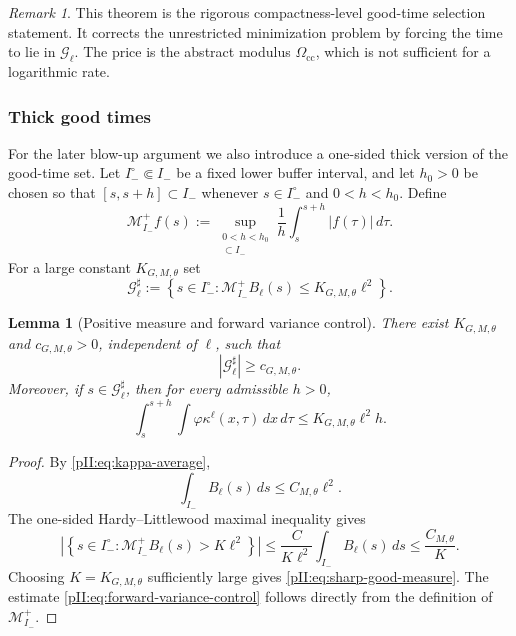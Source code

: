 \documentclass[11pt]{article}
\numberwithin{equation}{section}
\theoremstyle{plain}
\newtheorem{lemma}{Lemma}[section]
\theoremstyle{definition}
\theoremstyle{remark}
\newtheorem{remark}{Remark}[section]
\newcommand{\cc}{\mathrm{cc}}
\newcommand{\dx}{\,dx}
\begin{document}
\begin{remark}\label{pII:rem:abstract-selection-status}
This theorem is the rigorous compactness-level good-time selection statement.  It corrects the unrestricted minimization problem by forcing the time to lie in $\mathcal G_\ell$.  The price is the abstract modulus $\Omega_{\cc}$, which is not sufficient for a logarithmic rate.
\end{remark}

\subsubsection{Thick good times}

For the later blow-up argument we also introduce a one-sided thick version of the good-time set.  Let $I_-^\circ\Subset I_-$ be a fixed lower buffer interval, and let $h_0>0$ be chosen so that $[s,s+h]\subset I_-$ whenever $s\in I_-^\circ$ and $0<h<h_0$.  Define
\begin{equation}\label{pII:eq:forward-maximal}
        \mathcal M^+_{I_-}f(s)
        :=\sup_{\substack{0<h<h_0\\ [s,s+h]\subset I_-}}
        \frac1h\int_s^{s+h}|f(\tau)|\,d\tau .
\end{equation}
For a large constant $K_{G,M,\theta}$ set
\begin{equation}\label{pII:eq:sharp-good-set}
        \mathcal G_\ell^\sharp
        :=\left\{s\in I_-^\circ:
        \mathcal M^+_{I_-}B_\ell(s)
        \le K_{G,M,\theta}\ell^2\right\}.
\end{equation}

\begin{lemma}[Positive measure and forward variance control]\label{pII:lem:sharp-good-measure}
There exist $K_{G,M,\theta}$ and $c_{G,M,\theta}>0$, independent of $\ell$, such that
\begin{equation}\label{pII:eq:sharp-good-measure}
        |\mathcal G_\ell^\sharp|\ge c_{G,M,\theta}.
\end{equation}
Moreover, if $s\in\mathcal G_\ell^\sharp$, then for every admissible $h>0$,
\begin{equation}\label{pII:eq:forward-variance-control}
        \int_s^{s+h}\int\varphi\kappa^\ell(x,\tau)\dx\,d\tau
        \le K_{G,M,\theta}\ell^2h .
\end{equation}
\end{lemma}

\begin{proof}
By \eqref{pII:eq:kappa-average},
\[
        \int_{I_-}B_\ell(s)\,ds\le C_{M,\theta}\ell^2.
\]
The one-sided Hardy--Littlewood maximal inequality gives
\[
        \left|\left\{s\in I_-^\circ:
        \mathcal M^+_{I_-}B_\ell(s)>K\ell^2\right\}\right|
        \le \frac{C}{K\ell^2}\int_{I_-}B_\ell(s)\,ds
        \le \frac{C_{M,\theta}}{K}.
\]
Choosing $K=K_{G,M,\theta}$ sufficiently large gives \eqref{pII:eq:sharp-good-measure}.  The estimate \eqref{pII:eq:forward-variance-control} follows directly from the definition of $\mathcal M^+_{I_-}$.
\end{proof}
\end{document}
